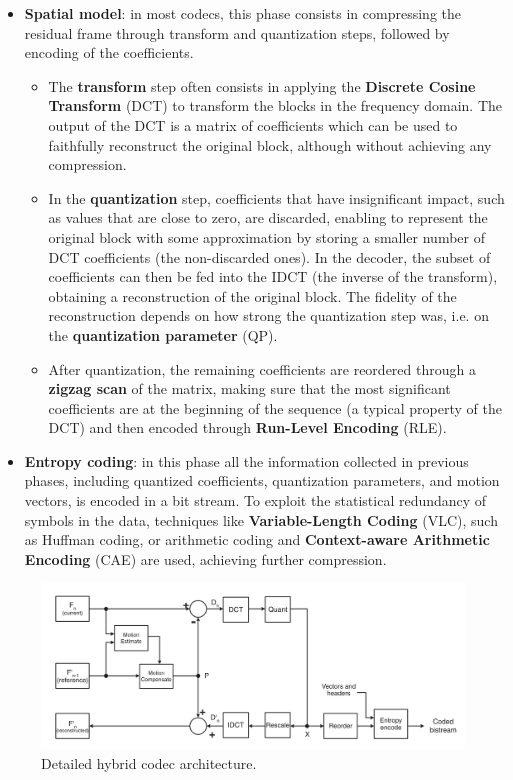 \begin{itemize}
    \item \textbf{Spatial model}: in most codecs, this phase consists in compressing the residual frame through transform and quantization steps, followed by encoding of the coefficients.
        \begin{itemize}
            \item The \textbf{transform} step often consists in applying the \textbf{Discrete Cosine Transform} (DCT) to transform the blocks in the frequency domain. The output of the DCT is a matrix of coefficients which can be used to faithfully reconstruct the original block, although without achieving any compression.
            \item In the \textbf{quantization} step, coefficients that have insignificant impact, such as values that are close to zero, are discarded, enabling to represent the original block with some approximation by storing a smaller number of DCT coefficients (the non-discarded ones). In the decoder, the subset of coefficients can then be fed into the IDCT (the inverse of the transform), obtaining a reconstruction of the original block. The fidelity of the reconstruction depends on how strong the quantization step was, i.e. on the \textbf{quantization parameter} (QP).
            \item After quantization, the remaining coefficients are reordered through a \textbf{zigzag scan} of the matrix, making sure that the most significant coefficients are at the beginning of the sequence (a typical property of the DCT) and then encoded through \textbf{Run-Level Encoding} (RLE).
        \end{itemize}
     
    \item \textbf{Entropy coding}: in this phase all the information collected in previous phases, including quantized coefficients, quantization parameters, and motion vectors, is encoded in a bit stream. To exploit the statistical redundancy of symbols in the data, techniques like \textbf{Variable-Length Coding} (VLC), such as Huffman coding, or arithmetic coding and \textbf{Context-aware Arithmetic Encoding} (CAE) are used, achieving further compression.
\end{itemize}

\begin{figure}[hb]
	\centering
	
	\includegraphics[width=\textwidth]{res/hybrid_codec_detailed.png}
	
	\caption{Detailed hybrid codec architecture.\cite{h264}}
	\label{fig:codec_highlevel}
\end{figure}

